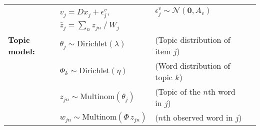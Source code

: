 \begin{tabular}{lllr}
&  $v_j = D x_j + \epsilon_{j}^{v}$,
	   & $\epsilon_{j}^{v} \sim \mathcal{N}(\bm{0},A_v)$ & \\
& 	$\bar{z}_{j} = \sum_n z_{jn} ~/~ W_j$
		& &  \vspace{0.07in}\\ 
{\bf Topic model:}
& 	$\theta_j \sim \textrm{Dirichlet}(\lambda)$
		& (Topic distribution of item $j$) & \\
& 	$\Phi_k \sim \textrm{Dirichlet}(\eta)$
		& (Word distribution of topic $k$) & \\
&  $z_{jn} \sim \textrm{Multinom}(\theta_j)$
		& (Topic of the $n$th word in $j$) & \\ 
&  $w_{jn} \sim \textrm{Multinom}(\Phi \, z_{jn})$
		& ($n$th observed word in $j$) &  \vspace{0.07in}\\ \hline
\end{tabular}
\\

